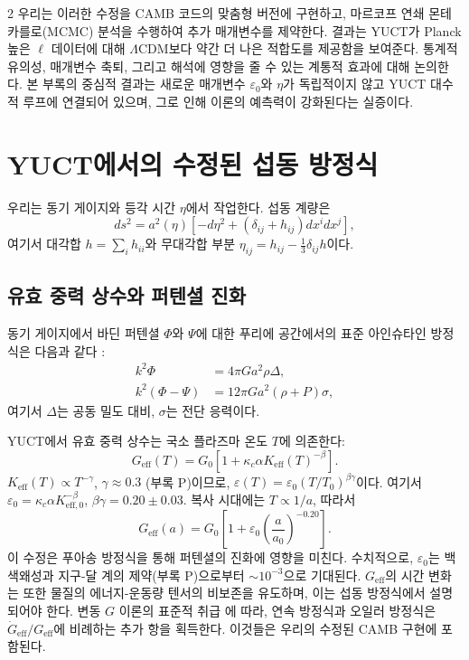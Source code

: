 \documentclass[11pt,a4paper]{article}
\begin{document}
\begin{multicols}{2}
		우리는 이러한 수정을 CAMB 코드의 맞춤형 버전에 구현하고, 마르코프 연쇄 몬테카를로(MCMC) 분석을 수행하여 추가 매개변수를 제약한다. 결과는 YUCT가 Planck 높은 $\ell$ 데이터에 대해 $\Lambda$CDM보다 약간 더 나은 적합도를 제공함을 보여준다. 통계적 유의성, 매개변수 축퇴, 그리고 해석에 영향을 줄 수 있는 계통적 효과에 대해 논의한다. 본 부록의 중심적 결과는 새로운 매개변수 $\varepsilon_0$와 $\eta$가 독립적이지 않고 YUCT 대수적 루프에 연결되어 있으며, 그로 인해 이론의 예측력이 강화된다는 실증이다.
		
		\section{YUCT에서의 수정된 섭동 방정식}
		
		우리는 동기 게이지와 등각 시간 $\eta$에서 작업한다. 섭동 계량은
		\begin{equation}
			ds^2 = a^2(\eta)\left[ -d\eta^2 + (\delta_{ij} + h_{ij}) dx^i dx^j \right],
		\end{equation}
		여기서 대각합 $h = \sum_i h_{ii}$와 무대각합 부분 $\eta_{ij} = h_{ij} - \frac{1}{3}\delta_{ij}h$이다.
		
		\subsection{유효 중력 상수와 퍼텐셜 진화}
		
		동기 게이지에서 바딘 퍼텐셜 $\Phi$와 $\Psi$에 대한 푸리에 공간에서의 표준 아인슈타인 방정식은 다음과 같다 \cite{Ma1995}:
		\begin{align}
			k^2 \Phi &= 4\pi G a^2 \rho \Delta, \\
			k^2 (\Phi - \Psi) &= 12\pi G a^2 (\rho+P) \sigma,
		\end{align}
		여기서 $\Delta$는 공동 밀도 대비, $\sigma$는 전단 응력이다.
		
		YUCT에서 유효 중력 상수는 국소 플라즈마 온도 $T$에 의존한다:
		\begin{equation}
			G_{\mathrm{eff}}(T) = G_0\left[1 + \kappa_c \alpha K_{\mathrm{eff}}(T)^{-\beta}\right].
			\label{eq:Geff}
		\end{equation}
		$K_{\mathrm{eff}}(T) \propto T^{-\gamma}$, $\gamma \approx 0.3$ (부록 P)이므로, $\varepsilon(T) = \varepsilon_0 (T/T_0)^{\beta\gamma}$이다. 여기서 $\varepsilon_0 = \kappa_c \alpha K_{\mathrm{eff},0}^{-\beta}$, $\beta\gamma = 0.20 \pm 0.03$. 복사 시대에는 $T \propto 1/a$, 따라서
		\begin{equation}
			G_{\mathrm{eff}}(a) = G_0\left[1 + \varepsilon_0 \left(\frac{a}{a_0}\right)^{-0.20}\right].
			\label{eq:Geff_a}
		\end{equation}
		이 수정은 푸아송 방정식을 통해 퍼텐셜의 진화에 영향을 미친다. 수치적으로, $\varepsilon_0$는 백색왜성과 지구-달 계의 제약(부록 P)으로부터 $\sim 10^{-3}$으로 기대된다. $G_{\mathrm{eff}}$의 시간 변화는 또한 물질의 에너지-운동량 텐서의 비보존을 유도하며, 이는 섭동 방정식에서 설명되어야 한다. 변동 $G$ 이론의 표준적 취급 \cite{Uzan2011}에 따라, 연속 방정식과 오일러 방정식은 $\dot{G}_{\mathrm{eff}}/G_{\mathrm{eff}}$에 비례하는 추가 항을 획득한다. 이것들은 우리의 수정된 CAMB 구현에 포함된다.
		

\end{multicols}
\end{document}
